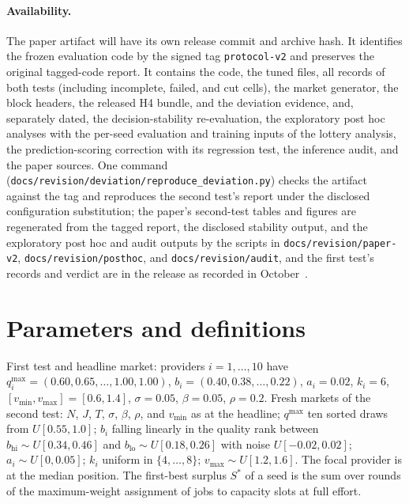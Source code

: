 \documentclass[11pt]{article}
\begin{document}
\paragraph{Availability.} The paper artifact will have its own release commit and archive hash. It identifies the frozen evaluation code by the signed tag \texttt{protocol-v2} and preserves the original tagged-code report. It contains the code, the tuned files, all records of both tests (including incomplete, failed, and cut cells), the market generator, the block headers, the released H4 bundle, and the deviation evidence, and, separately dated, the decision-stability re-evaluation, the exploratory post hoc analyses with the per-seed evaluation and training inputs of the lottery analysis, the prediction-scoring correction with its regression test, the inference audit, and the paper sources. One command (\texttt{docs/revision/deviation/reproduce\_deviation.py}) checks the artifact against the tag and reproduces the second test's report under the disclosed configuration substitution; the paper's second-test tables and figures are regenerated from the tagged report, the disclosed stability output, and the exploratory post hoc and audit outputs by the scripts in \texttt{docs/revision/paper-v2}, \texttt{docs/revision/posthoc}, and \texttt{docs/revision/audit}, and the first test's records and verdict are in the release as recorded in October~.

\appendix
\section{Parameters and definitions}\label{sec:app-params}\label{app:params}
First test and headline market: providers $i = 1, \dots, 10$ have $q^{\max}_i = (0.60, 0.65, \dots, 1.00, 1.00)$, $b_i = (0.40, 0.38, \dots, 0.22)$, $a_i = 0.02$, $k_i = 6$, $[v_{\min}, v_{\max}] = [0.6, 1.4]$, $\sigma = 0.05$, $\beta = 0.05$, $\rho = 0.2$. Fresh markets of the second test: $N$, $J$, $T$, $\sigma$, $\beta$, $\rho$, and $v_{\min}$ as at the headline; $q^{\max}$ ten sorted draws from $U[0.55, 1.0]$; $b_i$ falling linearly in the quality rank between $b_{\mathrm{hi}} \sim U[0.34, 0.46]$ and $b_{\mathrm{lo}} \sim U[0.18, 0.26]$ with noise $U[-0.02, 0.02]$; $a_i \sim U[0, 0.05]$; $k_i$ uniform in $\{4, \dots, 8\}$; $v_{\max} \sim U[1.2, 1.6]$. The focal provider is at the median position. The first-best surplus $S^*$ of a seed is the sum over rounds of the maximum-weight assignment of jobs to capacity slots at full effort.
\end{document}
